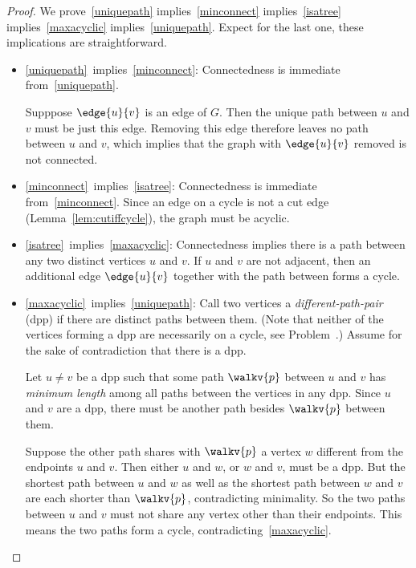 \begin{proof}

We prove~\eqref{uniquepath} implies~\eqref{minconnect}
implies~\eqref{isatree} implies~\eqref{maxacyclic}
implies~\eqref{uniquepath}.  Expect for the last one, these
implications are straightforward.

\begin{itemize}

\item \eqref{uniquepath}~implies~\eqref{minconnect}: Connectedness is
  immediate from~\eqref{uniquepath}.

  Supppose $\edge{u}{v}$ is an edge of $G$.  Then the unique path
  between $u$ and $v$ must be just this edge.  Removing this edge
  therefore leaves no path between $u$ and $v$, which implies that the
  graph with $\edge{u}{v}$ removed is not connected.

\item \eqref{minconnect}~implies~\eqref{isatree}: Connectedness is
  immediate from~\eqref{minconnect}.  Since an edge on a cycle is not
  a cut edge (Lemma~\ref{lem:cutiffcycle}), the graph must be acyclic.

\item\eqref{isatree}~implies~\eqref{maxacyclic}: Connectedness implies
  there is a path between any two distinct vertices $u$ and $v$.  If
  $u$ and $v$ are not adjacent, then an additional edge $\edge{u}{v}$
  together with the path between forms a cycle.

\item\eqref{maxacyclic}~implies~\eqref{uniquepath}: Call two vertices
  a \emph{different-path-pair} (dpp) if there are distinct paths
  between them.  (Note that neither of the vertices forming a dpp are
  necessarily on a cycle, see Problem~.)
  Assume for the sake of contradiction that there is a dpp.

  Let $u \neq v$ be a dpp such that some path $\walkv{p}$ between $u$
  and $v$ has \emph{minimum length} among all paths between the
  vertices in any dpp.  Since $u$ and $v$ are a dpp, there must be
  another path besides $\walkv{p}$ between them.

  Suppose the other path shares with $\walkv{p}$ a vertex $w$
  different from the endpoints $u$ and $v$.  Then either $u$ and $w$,
  or $w$ and $v$, must be a dpp.  But the shortest path between $u$
  and $w$ as well as the shortest path between $w$ and $v$ are each
  shorter than $\walkv{p}$, contradicting minimality.  So the two
  paths between $u$ and $v$ must not share any vertex other than their
  endpoints.  This means the two paths form a cycle,
  contradicting~\eqref{maxacyclic}.


\end{itemize}
\end{proof}
